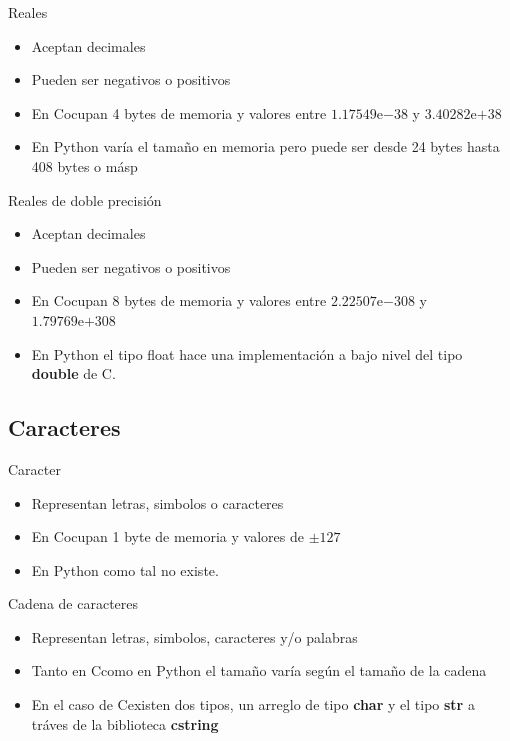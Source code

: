 \documentclass{beamer}
\newcommand{\Rplus}{\protect\hspace{-.1em}\protect\raisebox{.35ex}{\smaller{\smaller\textbf{+}}}}
\newcommand{\Cpp}{\mbox{C\Rplus\Rplus}\hspace{3pt}}
\newcommand{\expnumber}[2]{{#1}\mathrm{e}{#2}}
\begin{document}
	\begin{frame}{Reales}
		\begin{itemize}
			\item Aceptan decimales
			\item Pueden ser negativos o positivos
			\item En \Cpp  ocupan 4 bytes de memoria y valores entre $\expnumber{1.17549}{-38}$ y $\expnumber{3.40282}{+38}$ 
			\item En Python var\'ia el tamaño en memoria pero puede ser desde 24 bytes hasta 408 bytes o m\'asp
		\end{itemize}
	\end{frame}
	
	\begin{frame}{Reales de doble precisi\'on}
		\begin{itemize}
			\item Aceptan decimales
			\item Pueden ser negativos o positivos
			\item En \Cpp  ocupan 8 bytes de memoria y valores entre $\expnumber{2.22507}{-308}$ y $\expnumber{1.79769}{+308}$ 
			\item En Python el tipo float hace una implementaci\'on a bajo nivel del tipo \textbf{double} de C.
		\end{itemize}
	\end{frame}
	
	\subsection{Caracteres}
	
	\begin{frame}{Caracter}
		\begin{itemize}
			\item Representan letras, simbolos o caracteres
			\item En \Cpp  ocupan 1 byte de memoria y valores  de $\pm 127$ 
			\item En Python como tal no existe.
		\end{itemize}
	\end{frame}
	
	\begin{frame}{Cadena de caracteres}
		\begin{itemize}
			\item Representan letras, simbolos, caracteres y/o palabras
			\item Tanto en \Cpp como en Python el tamaño var\'ia seg\'un el tamaño de la cadena
			\item En el caso de \Cpp existen dos tipos, un arreglo de tipo \textbf{char} y el tipo \textbf{str} a tr\'aves de la biblioteca \textbf{cstring}
		\end{itemize}
	\end{frame}
	
\end{document}
